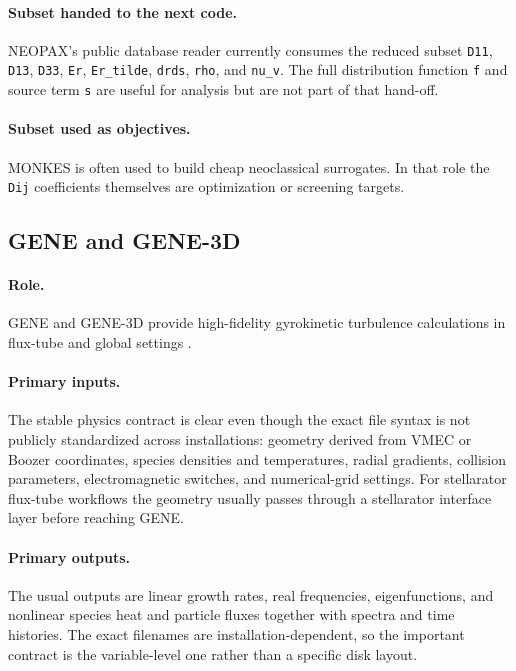 \documentclass[11pt]{article}
\newcommand{\code}[1]{\texttt{#1}}
\begin{document}
\paragraph{Subset handed to the next code.}
NEOPAX's public database reader currently consumes the reduced subset
\code{D11}, \code{D13}, \code{D33}, \code{Er}, \code{Er\_tilde},
\code{drds}, \code{rho}, and \code{nu\_v}. The full distribution function
\code{f} and source term \code{s} are useful for analysis but are not part of
that hand-off.

\paragraph{Subset used as objectives.}
MONKES is often used to build cheap neoclassical surrogates. In that role the
\code{Dij} coefficients themselves are optimization or screening targets.

\subsection{GENE and GENE-3D}

\paragraph{Role.}
GENE and GENE-3D provide high-fidelity gyrokinetic turbulence calculations in
flux-tube and global settings \citep{Gorler2011GENE,Merz2012GENE,Xanthopoulos2020GENE3D,GENEWebsite}.

\paragraph{Primary inputs.}
The stable physics contract is clear even though the exact file syntax is not
publicly standardized across installations: geometry derived from VMEC or
Boozer coordinates, species densities and temperatures, radial gradients,
collision parameters, electromagnetic switches, and numerical-grid settings.
For stellarator flux-tube workflows the geometry usually passes through a
stellarator interface layer before reaching GENE.

\paragraph{Primary outputs.}
The usual outputs are linear growth rates, real frequencies, eigenfunctions,
and nonlinear species heat and particle fluxes together with spectra and time
histories. The exact filenames are installation-dependent, so the important
contract is the variable-level one rather than a specific disk layout.
\end{document}
